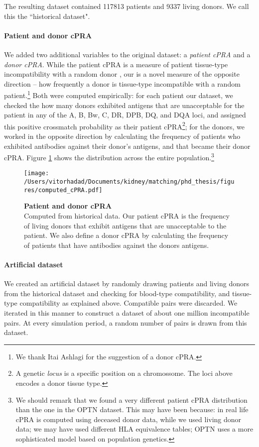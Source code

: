 The resulting dataset contained 117813 patients and 9337 living donors. We call this the ``historical dataset".

\paragraph{Patient and donor cPRA} We added two additional variables to the original dataset: a \emph{patient cPRA} and a \emph{donor cPRA}. While the patient cPRA is a measure of patient tissue-type incompatibility with a random donor \cite{cecka2010calculated}, our  is a novel measure of the opposite direction -- how frequently a donor is tissue-type incompatible with a random patient.\footnote{We thank Itai Ashlagi for the suggestion of a donor cPRA.} Both were computed empirically: for each patient our dataset, we checked the how many donors exhibited antigens that are unacceptable for the patient in any of the A, B, Bw, C, DR, DPB, DQ, and DQA loci, and assigned this positive crossmatch probability as their patient cPRA\footnote{A genetic \emph{locus} is a specific position on a chromossome. The loci above encodes a donor tissue type.}; for the donors, we worked in the opposite direction by calculating the frequency of patients who exhibited antibodies against their donor's antigens, and that became their donor cPRA. Figure \ref{fig:cpra} shows the distribution across the entire population.\footnote{We should remark that we found a very different patient cPRA distribution than the one in the OPTN dataset. This may have been because: in real life cPRA is computed using deceased donor data, while we used living donor data; we may have used different HLA equivalence tables; OPTN uses a more sophisticated model based on population genetics.\cite{optn2013cpra}}


\begin{figure}
\centering
\texttt{[image: /Users/vitorhadad/Documents/kidney/matching/phd\_thesis/figures/computed\_cPRA.pdf]}
\caption[Patient and donor cPRA]{\textbf{Patient and donor cPRA} \\
    Computed from historical data. Our patient cPRA is the frequency of living donors that exhibit antigens that are unacceptable to the patient. We also define a donor cPRA by calculating the frequency of patients that have antibodies against the donors antigens.}
\label{fig:cpra}
\end{figure}


\paragraph{Artificial dataset} We created an artificial dataset by randomly drawing patients and living donors from the historical dataset and checking for blood-type compatibility, and tissue-type compatibility as explained above. Compatible pairs were discarded. We iterated in this manner to construct a dataset of about one million incompatible pairs. At every simulation period, a random number of pairs is drawn from this dataset.


